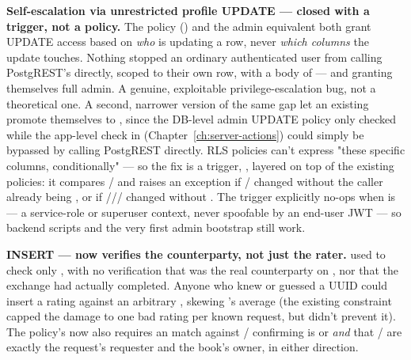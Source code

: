 \begin{olknote}
\textbf{Self-escalation via unrestricted profile UPDATE — closed with a trigger, not a policy.} The  policy () and the admin equivalent both grant UPDATE access based on \emph{who} is updating a row, never \emph{which columns} the update touches. Nothing stopped an ordinary authenticated user from calling PostgREST's  directly, scoped to their own row, with a body of  — and granting themselves full admin. A genuine, exploitable privilege-escalation bug, not a theoretical one. A second, narrower version of the same gap let an existing  promote themselves to , since the DB-level admin UPDATE policy only checked  while the app-level  check in  (Chapter~\ref{ch:server-actions}) could simply be bypassed by calling PostgREST directly. RLS policies can't express "these specific columns, conditionally" — so the fix is a  trigger, , layered on top of the existing policies: it compares / and raises an exception if / changed without the caller already being , or if /// changed without . The trigger explicitly no-ops when  is  — a service-role or superuser context, never spoofable by an end-user JWT — so backend scripts and the very first admin bootstrap still work.
\end{olknote}

\begin{olknote}
\textbf{ INSERT — now verifies the counterparty, not just the rater.}  used to check only , with no verification that  was the real counterparty on , nor that the exchange had actually completed. Anyone who knew or guessed a  UUID could insert a rating against an arbitrary , skewing 's average (the existing  constraint capped the damage to one bad rating per known request, but didn't prevent it). The policy's  now also requires an  match against / confirming  is  or  \emph{and} that / are exactly the request's requester and the book's owner, in either direction.
\end{olknote}

